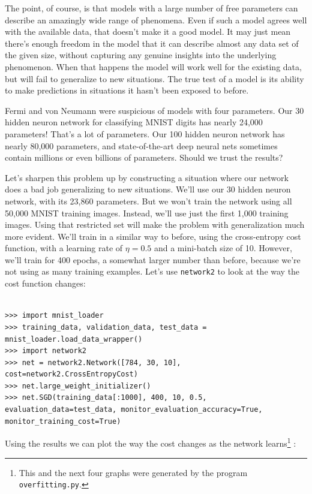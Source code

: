 \documentclass[a4paper,twoside,10pt]{book}
\begin{document}
The point, of course, is that models with a large number of free parameters can describe an amazingly wide range of phenomena. Even if such a model agrees well with the available data, that doesn't make it a good model. It may just mean there's enough freedom in the model that it can describe almost any data set of the given size, without capturing any genuine insights into the underlying phenomenon. When that happens the model will work well for the existing data, but will fail to generalize to new situations. The true test of a model is its ability to make predictions in situations it hasn't been exposed to before.

Fermi and von Neumann were suspicious of models with four parameters. Our 30 hidden neuron network for classifying MNIST digits has nearly 24,000 parameters! That's a lot of parameters. Our 100 hidden neuron network has nearly 80,000 parameters, and state-of-the-art deep neural nets sometimes contain millions or even billions of parameters. Should we trust the results?

Let's sharpen this problem up by constructing a situation where our network does a bad job generalizing to new situations. We'll use our 30 hidden neuron network, with its 23,860 parameters. But we won't train the network using all 50,000 MNIST training images. Instead, we'll use just the first 1,000 training images. Using that restricted set will make the problem with generalization much more evident. We'll train in a similar way to before, using the cross-entropy cost function, with a learning rate of $\eta=0.5$ and a mini-batch size of 10. However, we'll train for 400 epochs, a somewhat larger number than before, because we're not using as many training examples. Let's use \texttt{network2} to look at the way the cost function changes:


\begin{lstlisting}

>>> import mnist_loader 
>>> training_data, validation_data, test_data = mnist_loader.load_data_wrapper()
>>> import network2 
>>> net = network2.Network([784, 30, 10], cost=network2.CrossEntropyCost) 
>>> net.large_weight_initializer()
>>> net.SGD(training_data[:1000], 400, 10, 0.5, evaluation_data=test_data, monitor_evaluation_accuracy=True, monitor_training_cost=True)
\end{lstlisting}
Using the results we can plot the way the cost changes as the network learns\footnote{This and the next four graphs were generated by the program \texttt{overfitting.py}.} :
\end{document}
